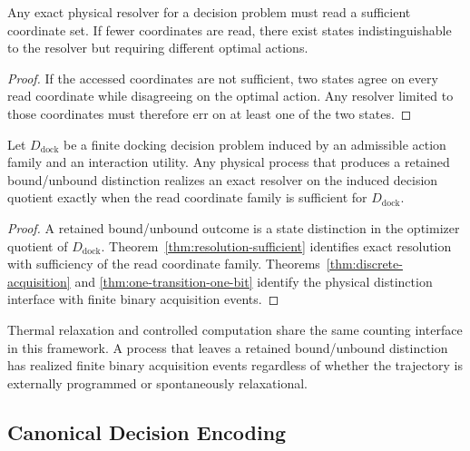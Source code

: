 \begin{theorem}\label{thm:resolution-sufficient}
Any exact physical resolver for a decision problem must read a sufficient coordinate set. If fewer coordinates are read, there exist states indistinguishable to the resolver but requiring different optimal actions.
\end{theorem}

\begin{proof}
If the accessed coordinates are not sufficient, two states agree on every read coordinate while disagreeing on the optimal action. Any resolver limited to those coordinates must therefore err on at least one of the two states.
\end{proof}

\begin{proposition}\label{prop:binding-as-exact-resolution}
Let $D_{\mathrm{dock}}$ be a finite docking decision problem induced by an admissible action family and an interaction utility. Any physical process that produces a retained bound/unbound distinction realizes an exact resolver on the induced decision quotient exactly when the read coordinate family is sufficient for $D_{\mathrm{dock}}$.
\end{proposition}

\begin{proof}
A retained bound/unbound outcome is a state distinction in the optimizer quotient of $D_{\mathrm{dock}}$. Theorem~\ref{thm:resolution-sufficient} identifies exact resolution with sufficiency of the read coordinate family. Theorems~\ref{thm:discrete-acquisition} and \ref{thm:one-transition-one-bit} identify the physical distinction interface with finite binary acquisition events.
\end{proof}

\begin{remark}\label{rem:relaxation-distinction-counting}
Thermal relaxation and controlled computation share the same counting interface in this framework. A process that leaves a retained bound/unbound distinction has realized finite binary acquisition events regardless of whether the trajectory is externally programmed or spontaneously relaxational.
\end{remark}

\subsection{Canonical Decision Encoding}

